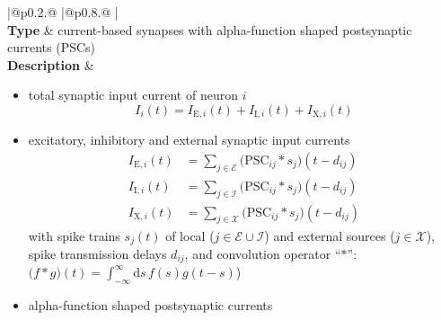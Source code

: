 \documentclass[10pt,a4paper,twoside,american]{article}
\newcommand{\Epop}{\mathcal{E}} %
\newcommand{\exc}{\text{E}}     %
\newcommand{\ext}{\text{X}}   %
\newcommand{\inh}{\text{I}}     %
\newcommand{\Ipop}{\mathcal{I}} %
\newcommand{\Xpop}{\mathcal{X}} %
\begin{document}
\begin{table}[H]
\begin{tabular}{
  |@{\hspace*{\marg}}p{}@{\hspace*{\marg}}
  |@{\hspace*{\marg}}p{}@{\hspace*{\marg}}
  |}
  \hline 
  \\
  \hline 
  \textbf{Type} & current-based synapses with alpha-function shaped postsynaptic currents (PSCs)\\
  \hline 
  \textbf{Description} &
                         \begin{itemize}
                         \item total synaptic input current of neuron $i$
                         \begin{equation*}
                           I_i(t)=I_{\exc,i}(t)+I_{\inh,i}(t)+I_{\ext,i}(t)
                         \end{equation*}
                       \item excitatory, inhibitory and external synaptic input currents 
                         \begin{equation*}
                            \begin{aligned}
                              I_{\exc,i}(t)&=\sum_{j\in\Epop}\bigl(\text{PSC}_{ij}*s_j\bigr)(t-d_{ij})\\
                              I_{\inh,i}(t)&=\sum_{j\in\Ipop}\bigl(\text{PSC}_{ij}*s_j\bigr)(t-d_{ij})\\
                              I_{\ext,i}(t)&=\sum_{j\in\Xpop}\bigl(\text{PSC}_{ij}*s_j\bigr)(t-d_{ij})
                            \end{aligned}
                          \end{equation*}
                        with spike trains $s_j(t)$ of local ($j\in\Epop\cup\Ipop$) and external sources ($j\in\Xpop$), spike transmission delays $d_{ij}$, and convolution operator ``$*$'': \mbox{$\displaystyle\bigl(f*g\bigr)(t)=\int_{-\infty}^\infty\text{d}s\,f(s)g(t-s)$})
                       \item alpha-function shaped postsynaptic currents

\end{itemize}
\end{tabular}
\end{table}
\end{document}
